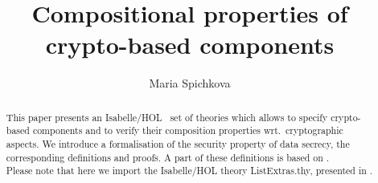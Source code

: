 \documentclass[11pt,a4paper]{article}
\begin{document}
\title{Compositional properties of crypto-based components}
\author{Maria Spichkova}
\maketitle


\begin{abstract}
This paper presents an Isabelle/HOL~\cite{npw} set of theories which allows  to specify
crypto-based components and to verify their composition properties wrt.\ cryptographic aspects.  
We introduce a formalisation of the security property of data secrecy, 
the corresponding definitions and proofs. 
A part of these definitions is based on  \cite{sj_TB08}.\\
Please note that here we import the Isabelle/HOL theory ListExtras.thy, presented in \cite{FocusStreamsCaseStudies-AFP}.
\end{abstract}

\tableofcontents
 
\newpage

 


\end{document}
